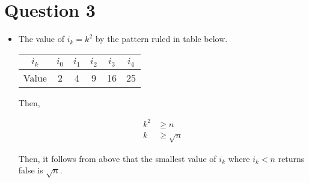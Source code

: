 \documentclass[12pt]{article}
\begin{document}
\section*{Question 3}
\begin{itemize}
    \item

    The value of $i_k = k^2$ by the pattern ruled in table below.

    \begin{tabular}{c|c|c|c|c|c}
        $i_k$ & $i_0$ & $i_1$ & $i_2$ & $i_3$ & $i_4$\\
        \hline
        Value & 2 & 4 & 9 & 16 & 25
    \end{tabular}

    \bigskip

    Then,

    \setcounter{equation}{0}
    \begin{align}
        k^2 &\geq n\\
        k &\geq \sqrt{n}
    \end{align}

    Then, it follows from above that the smallest value of $i_k$ where $i_k < n$
    returns false is $\sqrt{n}$.

\end{itemize}
\end{document}
